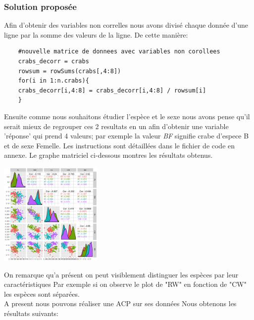 \documentclass[10pt]{article}
\begin{document}
	\subsubsection{Solution proposée}
	Afin d'obtenir des variables non correlles nous avons divisé chaque donnée d'une ligne par la somme des valeurs de la ligne. De cette manière:
	\begin{lstlisting}
	#nouvelle matrice de donnees avec variables non corollees
	crabs_decorr = crabs 
	rowsum = rowSums(crabs[,4:8])
	for(i in 1:n.crabs){
	crabs_decorr[i,4:8] = crabs_decorr[i,4:8] / rowsum[i] 
	}
	\end{lstlisting}
	Ensuite comme nous souhaitons étudier l'espèce et le sexe nous avons pense qu'il serait mieux de regrouper ces 2 resultats en un afin d'obtenir une variable 'réponse' qui prend 4 valeurs; par exemple la valeur \textit{BF} signifie crabe d'espece B et de sexe Femelle. Les instructions sont détaillées dans le fichier de code en annexe. Le graphe matriciel  ci-dessous montres les résultats obtenus.
	
	\begin{center}
		\includegraphics[width=50mm]{Figures/Crabs/matricial_plot_decorr_classes.png}	
		\label{fig:crabs_matricial_plot_decorr}
	\end{center}
	On remarque qu'a présent on peut visiblement distinguer les espèces par leur caractéristiques Par exemple si on observe le plot de  "RW" en fonction de "CW" les espèces sont séparées.\\
	A present nous pouvons réaliser une ACP sur ses données Nous obtenons les résultats suivants:
	
\end{document}

